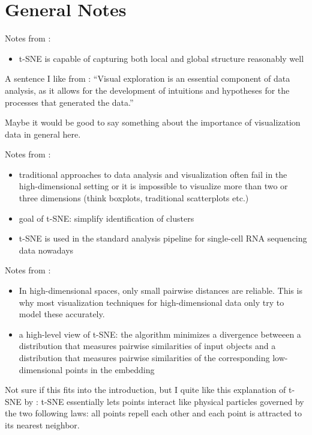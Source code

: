 \section*{General Notes}
Notes from \cite{vdMaa08}: 
\begin{itemize}
    \item t-SNE is capable of capturing both local and global structure reasonably well 
\end{itemize}
A sentence I like from \cite{vdMaa14}: \enquote{Visual exploration is an essential component of data analysis, as it allows for the development of intuitions and hypotheses for the processes that generated the data.}

Maybe it would be good to say something about the importance of visualization data in general here. 

Notes from \cite{LinStei22}:
\begin{itemize}
    \item traditional approaches to data analysis and visualization often fail in the high-dimen\-sio\-nal setting or it is impossible to visualize more than two or three dimensions (think boxplots, traditional scatterplots etc.)
    \item goal of t-SNE: simplify identification of clusters 
    \item t-SNE is used in the standard analysis pipeline for single-cell RNA sequencing data nowadays
\end{itemize}

Notes from \cite{vdMaa14}:
\begin{itemize}
    \item In high-dimensional spaces, only small pairwise distances are reliable. This is why most visualization techniques for high-dimensional data only try to model these accurately. 
    \item a high-level view of t-SNE: the algorithm minimizes a divergence betweeen a distribution that measures pairwise similarities of input objects and a distribution that measures pairwise similarities of the corresponding low-dimensional points in the embedding 
\end{itemize}

Not sure if this fits into the introduction, but I quite like this explanation of t-SNE by \cite{KoBe19SingleCell}: t-SNE essentially lets points interact like physical particles governed by the two following laws: all points repell each other and each point is attracted to its nearest neighbor.

